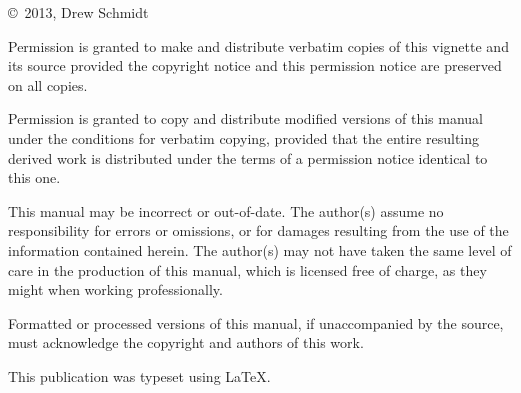 
\null
\vfill
\copyright\ 2013, Drew Schmidt

Permission is granted to make and distribute verbatim copies of
this vignette and its source provided the copyright notice and
this permission notice are preserved on all copies.

Permission is granted to copy and distribute modified versions of
this manual under the conditions for verbatim copying, provided that
the entire resulting derived work is distributed under the terms of
a permission notice identical to this one.

This manual may be incorrect or out-of-date.  The author(s) assume
no responsibility for errors or omissions, or for damages resulting
from the use of the information contained herein.  The author(s) may
not have taken the same level of care in the production of this
manual, which is licensed free of charge, as they might when working
professionally.

Formatted or processed versions of this manual, if unaccompanied by
the source, must acknowledge the copyright and authors of this work.

This publication was typeset using \LaTeX.
